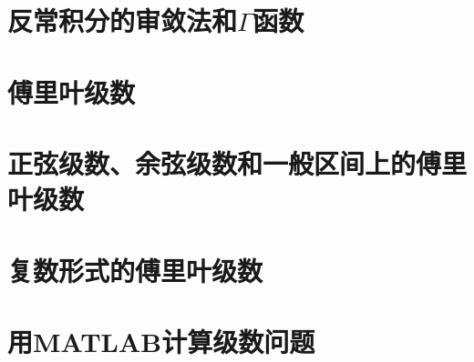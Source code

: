 
\section{反常积分的审敛法和$\Gamma$函数}

\section{傅里叶级数}

\section{正弦级数、余弦级数和一般区间上的傅里叶级数}

\section{复数形式的傅里叶级数}

\section{用MATLAB计算级数问题}



